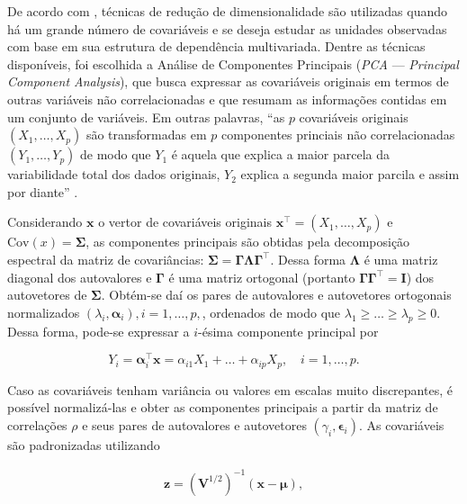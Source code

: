 \documentclass[12pt, a4paper, twoside]{report}
\numberwithin{equation}{subsection} %
\begin{document}
 De acordo com \cite{morettindatasci}, técnicas de redução de dimensionalidade são utilizadas quando há um grande número de covariáveis e se deseja estudar as unidades observadas com base em sua estrutura de dependência multivariada. Dentre as técnicas disponíveis, foi escolhida a Análise de Componentes Principais (\textit{PCA} --- \textit{Principal Component Analysis}), que busca expressar as covariáveis originais em termos de outras variáveis não correlacionadas e que resumam as informações contidas em um conjunto de variáveis. Em outras palavras, ``as $p$ covariáveis originais $(X_1, \dots , X_p)$ são transformadas em $p$ componentes princiais não correlacionadas $(Y_1, \dots, Y_p)$ de modo que $Y_1$ é aquela que explica a maior parcela da variabilidade total dos dados originais, $Y_2$ explica a segunda maior parcila e assim por diante'' \citep{metodosmultivariados_artes}. 
 
Considerando $\boldsymbol{x}$ o vertor de covariáveis originais $\boldsymbol{x}^\top = (X_1, \dots, X_p)$ e $\text{Cov}(x) = \boldsymbol{\Sigma}$, as componentes principais são obtidas pela decomposição espectral da matriz de covariâncias: $\boldsymbol{\Sigma} = \boldsymbol{\Gamma \Lambda \Gamma}^\top$. Dessa forma $\boldsymbol{\Lambda}$ é uma matriz diagonal dos autovalores e $\boldsymbol{\Gamma}$ é uma matriz ortogonal (portanto $\boldsymbol{\Gamma \Gamma}^\top = \boldsymbol{I}$) dos autovetores de $\boldsymbol{\Sigma}$. Obtém-se daí os pares de autovalores e autovetores ortogonais normalizados $(\lambda_i, \boldsymbol{\alpha}_i), i = 1, \dots, p,$, ordenados de modo que $\lambda_1 \geq \dots \geq \lambda_p \geq 0$. Dessa forma, pode-se expressar a $i$-ésima componente principal por

\begin{equation}
	Y_i = \boldsymbol{\alpha}_i^\top \boldsymbol{x} = \alpha_{i1}X_1 + \dots + \alpha_{ip}X_p, \quad i = 1, \dots , p.
\end{equation}

Caso as covariáveis tenham variância ou valores em escalas muito discrepantes, é possível normalizá-las e obter as componentes principais a partir da matriz de correlações $\rho$ e seus pares de autovalores e autovetores $(\gamma_i, \boldsymbol{\epsilon}_i)$. As covariáveis são padronizadas utilizando

\begin{align}
	\boldsymbol{z} = \left( \boldsymbol{V}^{1/2}\right)^{-1} (\boldsymbol{x} - \boldsymbol{\mu}),
\end{align}
\end{document}

